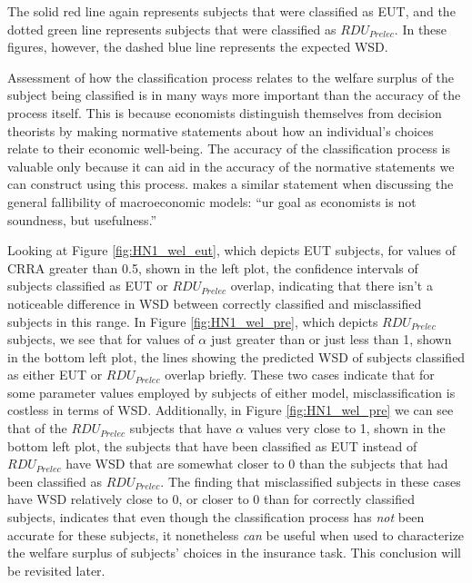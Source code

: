 \documentclass[../main.tex]{subfiles}
\begin{document}
The solid red line again represents subjects that were classified as EUT, and the dotted green line represents subjects that were classified as $\mathit{RDU_{Prelec}}$.
In these figures, however, the dashed blue line represents the expected WSD.

Assessment of how the classification process relates to the welfare surplus of the subject being classified is in many ways more important than the accuracy of the process itself.
This is because economists distinguish themselves from decision theorists by making normative statements about how an individual's choices relate to their economic well-being.
The accuracy of the classification process is valuable only because it can aid in the accuracy of the normative statements we can construct using this process.
\textcite[25]{Leamer2012} makes a similar statement when discussing the general fallibility of macroeconomic models: \enquote{ur goal as economists is not soundness, but usefulness.}

Looking at Figure \ref{fig:HN1_wel_eut}, which depicts EUT subjects, for values of CRRA greater than 0.5, shown in the left plot, the confidence intervals of subjects classified as EUT or $\mathit{RDU_{Prelec}}$ overlap, indicating that there isn't a noticeable difference in WSD between correctly classified and misclassified subjects in this range.
In Figure \ref{fig:HN1_wel_pre}, which depicts $\mathit{RDU_{Prelec}}$ subjects, we see that for values of $\alpha$ just greater than or just less than 1, shown in the bottom left plot, the lines showing the predicted WSD of subjects classified as either EUT or $\mathit{RDU_{Prelec}}$ overlap briefly.
These two cases indicate that for some parameter values employed by subjects of either model, misclassification is costless in terms of WSD.
Additionally, in Figure \ref{fig:HN1_wel_pre} we can see that of the $\mathit{RDU_{Prelec}}$ subjects that have $\alpha$ values very close to 1, shown in the bottom left plot, the subjects that have been classified as EUT instead of $\mathit{RDU_{Prelec}}$ have WSD that are somewhat closer to 0 than the subjects that had been classified as $\mathit{RDU_{Prelec}}$.
The finding that misclassified subjects in these cases have WSD relatively close to 0, or closer to 0 than for correctly classified subjects, indicates that even though the classification process has \textit{not} been accurate for these subjects, it nonetheless \textit{can} be useful when used to characterize the welfare surplus of subjects' choices in the insurance task.
This conclusion will be revisited later.
\end{document}
